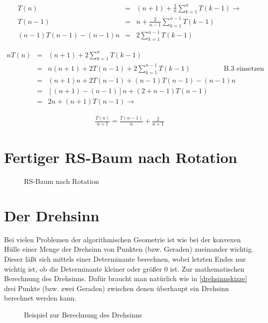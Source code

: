 \documentclass[ngerman,draft,parskip=half*,twoside]{scrreprt}
\theoremstyle{break}
\theoremstyle{nonumberbreak}
\begin{document}
\begin{align}
T(n) & = & (n+1)+ \frac{2}{n} \sum_{k=1}^nT(k-1) \rightarrow\\
T(n-1) & = & n+\frac{2}{n-1} \sum_{k=1}^{n-1}T(k-1)\\
(n-1)T(n-1) - (n-1)n & = & 2\sum_{k=1}^{n-1}T(k-1)
\end{align}

\begin{align*}
n T(n) & = & (n+1)+ 2 \sum_{k=1}^nT(k-1)\\
& = & n(n+1)+2 T(n-1) +2 \sum_{k=1}^{n-1}T(k-1) \hspace{2cm} \text{B.3 einsetzen}\\
& = & (n+1)n+2 T(n-1) + (n-1)T(n-1) -(n-1)n\\
& = & [(n+1)-(n-1)]n+(2+n-1) T(n-1)\\
& = & 2n+(n+1)T(n-1) \rightarrow 
\end{align*}

\begin{gather*}
\frac{T(n)}{n+1}= \frac{T(n-1)}{n}+ \frac{2}{n+1}	
\end{gather*}

\section{Fertiger RS-Baum nach Rotation}
\label{sec:rsrotation}

\begin{figure}[H]
\centering

\caption{RS-Baum nach Rotation}
\end{figure}

\section{Der Drehsinn} \label{drehsinn}
Bei vielen Problemen der algorithmischen Geometrie ist wie bei der konvexen Hülle einer Menge der Drehsinn von Punkten (bzw. Geraden) zueinander wichtig.
Dieser läßt sich mittels einer Determinante berechnen, wobei letzten Endes nur wichtig ist, ob die Determinante kleiner oder größer
0 ist. Zur
mathematischen Berechnung des Drehsinns. Dafür braucht man natürlich wie in
\autoref{drehsinnskizze} drei Punkte (bzw. zwei Geraden) zwischen denen überhaupt ein Drehsinn berechnet werden kann.

\begin{figure}[H]
\centering

\caption{Beispiel zur Berechnung des Drehsinns}
\label{drehsinnskizze}
\end{figure}
\end{document}
